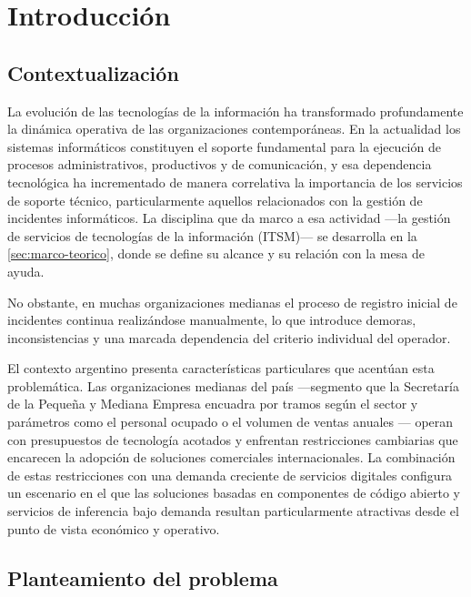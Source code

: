 \section{Introducción}\label{sec:introduccion}

\subsection{Contextualización}\label{subsec:contextualizacion}

La evolución de las tecnologías de la información ha transformado profundamente la dinámica operativa de las organizaciones contemporáneas. En la actualidad los sistemas informáticos constituyen el soporte fundamental para la ejecución de procesos administrativos, productivos y de comunicación, y esa dependencia tecnológica ha incrementado de manera correlativa la importancia de los servicios de soporte técnico, particularmente aquellos relacionados con la gestión de incidentes informáticos. La disciplina que da marco a esa actividad ---la gestión de servicios de tecnologías de la información (ITSM)--- se desarrolla en la \autoref{sec:marco-teorico}, donde se define su alcance y su relación con la mesa de ayuda.

No obstante, en muchas organizaciones medianas el proceso de registro inicial de incidentes continua realizándose manualmente, lo que introduce demoras, inconsistencias y una marcada dependencia del criterio individual del operador.

El contexto argentino presenta características particulares que acentúan esta problemática. Las organizaciones medianas del país ---segmento que la Secretaría de la Pequeña y Mediana Empresa encuadra por tramos según el sector y parámetros como el personal ocupado o el volumen de ventas anuales \parencite{SEPyME2026_mipyme}--- operan con presupuestos de tecnología acotados y enfrentan restricciones cambiarias que encarecen la adopción de soluciones comerciales internacionales. La combinación de estas restricciones con una demanda creciente de servicios digitales configura un escenario en el que las soluciones basadas en componentes de código abierto y servicios de inferencia bajo demanda resultan particularmente atractivas desde el punto de vista económico y operativo.

\subsection{Planteamiento del problema}\label{subsec:planteamiento-problema}

